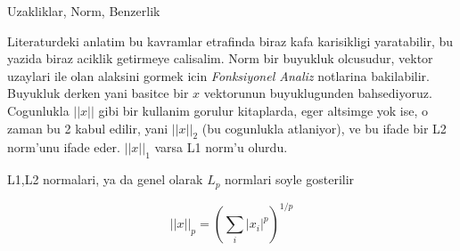 \documentclass[12pt,fleqn]{article}\usepackage{../common}
\begin{document}
Uzakliklar, Norm, Benzerlik

Literaturdeki anlatim bu kavramlar etrafinda biraz kafa karisikligi
yaratabilir, bu yazida biraz aciklik getirmeye calisalim. Norm bir buyukluk
olcusudur, vektor uzaylari ile olan alaksini gormek icin {\em Fonksiyonel
  Analiz} notlarina bakilabilir. Buyukluk derken yani basitce bir $x$
vektorunun buyuklugunden bahsediyoruz. Cogunlukla $||x||$ gibi bir kullanim
gorulur kitaplarda, eger altsimge yok ise, o zaman bu 2 kabul edilir, yani
$||x||_2$ (bu cogunlukla atlaniyor), ve bu ifade bir L2 norm'unu ifade
eder. $||x||_1$ varsa L1 norm'u olurdu.

L1,L2 normalari, ya da genel olarak $L_p$ normlari soyle gosterilir

$$ ||x||_p = (\sum_i |x_i|^p)^{1/p} $$
\end{document}
